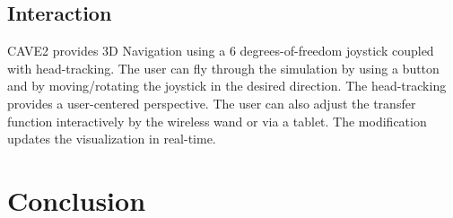\documentclass[10pt,twocolumn,letterpaper]{article}
\begin{document}
\subsection{Interaction}
CAVE2 provides 3D Navigation using a 6 degrees-of-freedom joystick coupled with head-tracking. The user can fly through the simulation by using a button and by moving/rotating the joystick in the desired direction. The head-tracking provides a user-centered perspective. The user can also adjust the transfer function interactively by the wireless wand or via a tablet. The modification updates the visualization in real-time.

\section{Conclusion}

{\small


}
\end{document}
